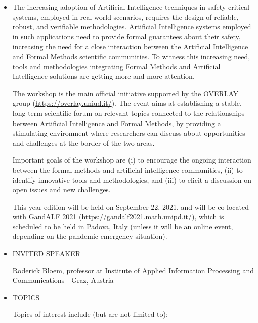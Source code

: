 \documentclass[prodmode,acmtecs]{acmsmall} %
\begin{document}
\begin{itemize}\item  The increasing adoption of Artificial Intelligence techniques in safety-critical systems, employed in real world scenarios, requires the design of reliable, robust, and verifiable methodologies. Artificial Intelligence systems employed in such applications need to provide formal guarantees about their safety, increasing the need for a close interaction between the Artificial Intelligence and Formal Methods scientific communities. To witness this increasing need, tools and methodologies integrating Formal Methods and Artificial Intelligence solutions are getting more and more attention. 
 
  The workshop is the main official initiative supported by the OVERLAY group (\href{https://overlay.uniud.it/}{https://overlay.uniud.it/}). The event aims at establishing a stable, long-term scientific forum on relevant topics connected to the relationships between Artificial Intelligence and Formal Methods, by providing a stimulating environment where researchers can discuss about opportunities and challenges at the border of the two areas. 
 
  Important goals of the workshop are (i) to encourage the ongoing interaction between the formal methods and artificial intelligence communities, (ii) to identify innovative tools and methodologies, and (iii) to elicit a discussion on open issues and new challenges. 
 
  This year edition will be held on September 22, 2021, and will be co-located with GandALF 2021 (\href{https://gandalf2021.math.unipd.it/}{https://gandalf2021.math.unipd.it/}), which is scheduled to be held in Padova, Italy (unless it will be an online event, depending on the pandemic emergency situation). 
 
\item  INVITED SPEAKER 
 
  Roderick Bloem, professor at Institute of Applied Information Processing and Communications - Graz, Austria 
 
\item  TOPICS 
 
  Topics of interest include (but are not limited to): 
 

\end{itemize}
\end{document}
